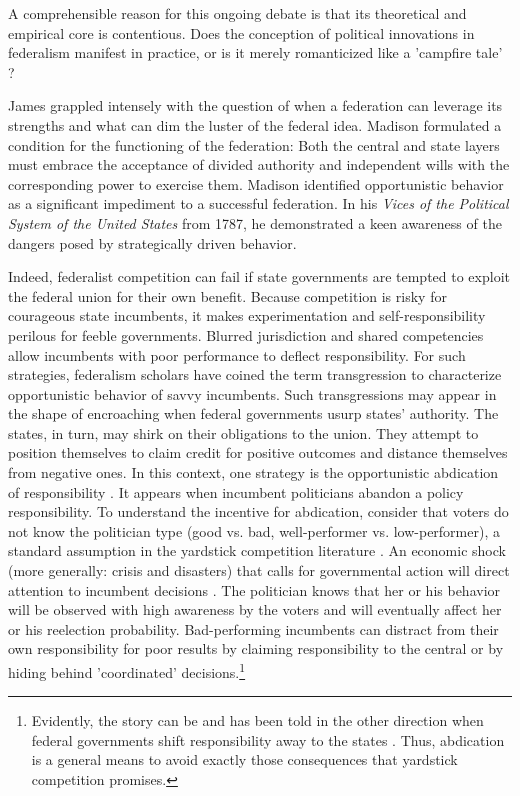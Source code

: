 \documentclass[12pt, abstracton]{scrartcl}
\begin{document}
A comprehensible reason for this ongoing debate is that its theoretical and empirical core is contentious. Does the conception of political innovations in federalism manifest in practice, or is it merely romanticized like a 'campfire tale' \citep{Tyler2022}?

James \cite{Madison1787} grappled intensely with the question of when a federation can leverage its strengths and what can dim the luster of the federal idea. Madison formulated a condition for the functioning of the federation: Both the central and state layers must embrace the acceptance of divided authority and independent wills with the corresponding power to exercise them. Madison identified opportunistic behavior as a significant impediment to a successful federation. In his \textit{Vices of the Political System of the United States} from 1787, he demonstrated a keen awareness of the dangers posed by strategically driven behavior. 

Indeed, federalist competition can fail if state governments are tempted to exploit the federal union for their own benefit. Because competition is risky for courageous state incumbents, it makes experimentation and self-responsibility perilous for feeble governments. Blurred jurisdiction and shared competencies allow incumbents with poor performance to deflect responsibility. For such strategies, federalism scholars have coined the term transgression \cite[Ch.~3]{Bednar2009} to characterize opportunistic behavior of savvy incumbents. Such transgressions may appear in the shape of encroaching when federal governments usurp states' authority. The states, in turn, may shirk on their obligations to the union. They attempt to position themselves to claim credit for positive outcomes and distance themselves from negative ones. In this context, one strategy is the opportunistic abdication of responsibility  \citep[Ch.~3]{Bednar2009}. It appears when incumbent politicians abandon a policy responsibility. To understand the incentive for abdication, consider that voters do not know the politician type (good vs. bad, well-performer vs. low-performer), a standard assumption in the yardstick competition literature \citep{BesleyCase1995, Revelli2005}. An economic shock (more generally: crisis and disasters) that calls for governmental action will direct attention to incumbent decisions \citep{Graham2023}. The politician knows that her or his behavior will be observed with high awareness by the voters and will eventually affect her or his reelection probability. Bad-performing incumbents can distract from their own responsibility for poor results by claiming responsibility to the central or by hiding behind 'coordinated' decisions.\footnote{
	Evidently, the story can be and has been told in the other direction when federal governments shift responsibility away to the states \citep{Shear2020}. Thus, abdication is a general means to avoid exactly those consequences that yardstick competition promises.}
\end{document}
